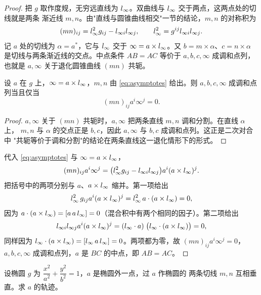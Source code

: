 \begin{proof}
把 $g$ 取作度规，无穷远直线为 $l_{\infty}$。双曲线与 $l_{\infty}$ 交于两点，这两点处的切线就是两条
渐近线 $m,n$。由"直线与圆锥曲线相交"一节的结论，$m,n$ 的对称积为
\begin{equation}
(mn)_{ij}=l_{\infty}^2g_{ij}-l_{\infty i}l_{\infty j},
\qquad l_{\infty}^2=g^{ij}l_{\infty i}l_{\infty j}.
\label{eq:asymptotes}
\end{equation}
记 $a$ 处的切线为 $\alpha=a^*$，它与 $l_{\infty}$ 交于 $\infty=a\times l_{\infty}$。又
$b=m\times\alpha$、$c=n\times\alpha$ 是切线与两条渐近线的交点。中点条件 $AB=AC$ 等价于
$a,b,c,\infty$ 成调和点列，也就是 $a,\infty$ 关于退化圆锥曲线 $(mn)$ 共轭。

\begin{lemma}
设 $a$ 在 $g$ 上，$\infty=a\times l_{\infty}$，$m,n$ 由 \eqref{eq:asymptotes} 给出。则
$a,b,c,\infty$ 成调和点列当且仅当
\[
(mn)_{ij}a^i\infty^j=0 .
\]
\end{lemma}

\begin{proof}
$a,\infty$ 关于 $(mn)$ 共轭时，$a,\infty$ 把两条直线 $m,n$ 调和分割。在直线 $\alpha$ 上，
$m,n$ 与 $\alpha$ 的交点正是 $b,c$，因此 $a,\infty$ 与 $b,c$ 成调和点列。这正是二次对合中
"共轭等价于调和分割"的结论在两条直线这一退化情形下的形式。
\end{proof}

代入 \eqref{eq:asymptotes} 与 $\infty=a\times l_{\infty}$，
\[
(mn)_{ij}a^i\infty^j
=\bigl(l_{\infty}^2g_{ij}-l_{\infty i}l_{\infty j}\bigr)a^i(a\times l_{\infty})^j .
\]
把括号中的两项分别与 $a$、$a\times l_{\infty}$ 缩并。第一项给出
\[
l_{\infty}^2\,g_{ij}a^i(a\times l_{\infty})^j=l_{\infty}^2\,a\cdot(a\times l_{\infty})=0,
\]
因为 $a\cdot(a\times l_{\infty})=[a\,a\,l_{\infty}]=0$（混合积中有两个相同的因子）。第二项给出
\[
l_{\infty i}l_{\infty j}a^i(a\times l_{\infty})^j
=(l_{\infty}\cdot a)\;\bigl(l_{\infty}\cdot(a\times l_{\infty})\bigr)=0,
\]
同样因为 $l_{\infty}\cdot(a\times l_{\infty})=[l_{\infty}\,a\,l_{\infty}]=0$。两项都为零，故
$(mn)_{ij}a^i\infty^j=0$，$a,b,c,\infty$ 成调和点列，$a$ 是 $BC$ 的中点，即 $AB=AC$。
\end{proof}

\begin{example}[蒙日圆]
设椭圆 $g$ 为 $\dfrac{x^2}{a^2}+\dfrac{y^2}{b^2}=1$，$a$ 是椭圆外一点，过 $a$ 作椭圆的
两条切线 $m,n$ 互相垂直。求 $a$ 的轨迹。
\end{example}

